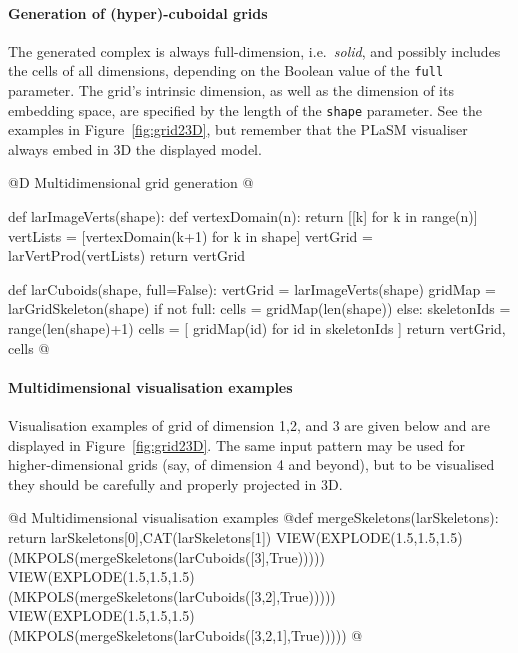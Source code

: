\documentclass[11pt,oneside]{article}	%
\begin{document}
\paragraph{Generation of (hyper)-cuboidal grids}

The generated complex is always full-dimension, i.e.~\emph{solid}, and possibly includes the cells of all dimensions, depending on the Boolean value of the \texttt{full} parameter.
The grid's intrinsic dimension, as well as the dimension of its embedding space, are specified by the length of the \texttt{shape} parameter. See the examples in Figure~\ref{fig:grid23D}, but remember that the PLaSM visualiser always embed in 3D the displayed model. 

@D Multidimensional grid generation
@{def larImageVerts(shape):
	def vertexDomain(n): 
		return [[k] for k in range(n)]
	vertLists = [vertexDomain(k+1) for k in shape]
	vertGrid = larVertProd(vertLists)
	return vertGrid

def larCuboids(shape, full=False):
	vertGrid = larImageVerts(shape)
	gridMap = larGridSkeleton(shape)
	if not full: 
		cells = gridMap(len(shape))
	else:
		skeletonIds = range(len(shape)+1)
		cells = [ gridMap(id) for id in skeletonIds ]
	return vertGrid, cells
@}

\paragraph{Multidimensional visualisation examples}
Visualisation examples of grid of dimension 1,2, and 3 are given below and are displayed  in Figure~\ref{fig:grid23D}. The same input pattern may be used for higher-dimensional grids (say, of dimension 4 and beyond), but to be visualised they should be carefully and properly projected in 3D.

@d Multidimensional visualisation examples
@{def mergeSkeletons(larSkeletons): return larSkeletons[0],CAT(larSkeletons[1])
VIEW(EXPLODE(1.5,1.5,1.5)(MKPOLS(mergeSkeletons(larCuboids([3],True)))))
VIEW(EXPLODE(1.5,1.5,1.5)(MKPOLS(mergeSkeletons(larCuboids([3,2],True)))))
VIEW(EXPLODE(1.5,1.5,1.5)(MKPOLS(mergeSkeletons(larCuboids([3,2,1],True)))))
@}
\end{document}
